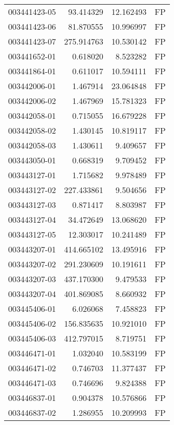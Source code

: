 \begin{tabular}{lrrl}
003441423-05 &   93.414329 &      12.162493 &   FP \\
003441423-06 &   81.870555 &      10.996997 &   FP \\
003441423-07 &  275.914763 &      10.530142 &   FP \\
003441652-01 &    0.618020 &       8.523282 &   FP \\
003441864-01 &    0.611017 &      10.594111 &   FP \\
003442006-01 &    1.467914 &      23.064848 &   FP \\
003442006-02 &    1.467969 &      15.781323 &   FP \\
003442058-01 &    0.715055 &      16.679228 &   FP \\
003442058-02 &    1.430145 &      10.819117 &   FP \\
003442058-03 &    1.430611 &       9.409657 &   FP \\
003443050-01 &    0.668319 &       9.709452 &   FP \\
003443127-01 &    1.715682 &       9.978489 &   FP \\
003443127-02 &  227.433861 &       9.504656 &   FP \\
003443127-03 &    0.871417 &       8.803987 &   FP \\
003443127-04 &   34.472649 &      13.068620 &   FP \\
003443127-05 &   12.303017 &      10.241489 &   FP \\
003443207-01 &  414.665102 &      13.495916 &   FP \\
003443207-02 &  291.230609 &      10.191611 &   FP \\
003443207-03 &  437.170300 &       9.479533 &   FP \\
003443207-04 &  401.869085 &       8.660932 &   FP \\
003445406-01 &    6.026068 &       7.458823 &   FP \\
003445406-02 &  156.835635 &      10.921010 &   FP \\
003445406-03 &  412.797015 &       8.719751 &   FP \\
003446471-01 &    1.032040 &      10.583199 &   FP \\
003446471-02 &    0.746703 &      11.377437 &   FP \\
003446471-03 &    0.746696 &       9.824388 &   FP \\
003446837-01 &    0.904378 &      10.576866 &   FP \\
003446837-02 &    1.286955 &      10.209993 &   FP \\

\end{tabular}
